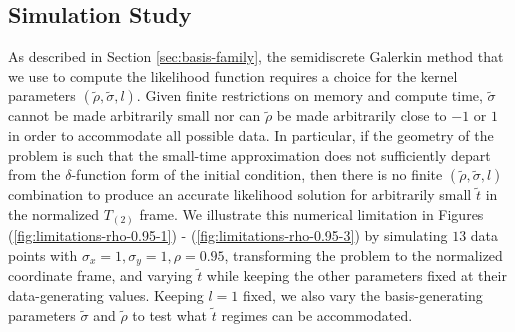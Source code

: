 \subsection{Simulation Study}
As described in Section \ref{sec:basis-family}, the semidiscrete
Galerkin method that we use to compute the likelihood function
requires a choice for the kernel parameters
$(\tilde{\rho}, \tilde{\sigma}, l)$. Given finite restrictions on
memory and compute time, $\tilde{\sigma}$ cannot be made arbitrarily
small nor can $\tilde{\rho}$ be made arbitrarily close to $-1$ or $1$
in order to accommodate all possible data. In particular, if the
geometry of the problem is such that the small-time approximation does
not sufficiently depart from the $\delta$-function form of the initial
condition, then there is no finite $(\tilde{\rho}, \tilde{\sigma}, l)$
combination to produce an accurate likelihood solution for arbitrarily
small $\tilde{t}$ in the normalized $T_{(2)}$ frame. We illustrate
this numerical limitation in Figures
(\ref{fig:limitations-rho-0.95-1}) -
(\ref{fig:limitations-rho-0.95-3}) by simulating $13$ data points with
$\sigma_x = 1, \sigma_y = 1, \rho = 0.95$, transforming the problem to
the normalized coordinate frame, and varying $\tilde{t}$ while keeping
the other parameters fixed at their data-generating values. Keeping
$l=1$ fixed, we also vary the basis-generating parameters $\tilde{\sigma}$
and $\tilde{\rho}$ to test what $\tilde{t}$ regimes can be
accommodated.

